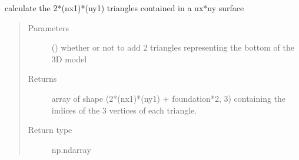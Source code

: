 \documentclass[letterpaper,10pt,english]{sphinxmanual}
\begin{document}

\begin{fulllineitems}
\label{\detokenize{stlutils:stlutils.create_faces}}
\sphinxAtStartPar
calculate the 2*(nx\sphinxhyphen{}1)*(ny\sphinxhyphen{}1) triangles contained in a nx*ny surface
\begin{quote}\begin{description}
\item[{Parameters}] \leavevmode
\sphinxAtStartPar
{} () \textendash{} whether or not to add 2 triangles representing the bottom of the 3D model

\item[{Returns}] \leavevmode
\sphinxAtStartPar
array of shape (2*(nx\sphinxhyphen{}1)*(ny\sphinxhyphen{}1) + foundation*2, 3) containing the indices of the 3 vertices of each triangle.

\item[{Return type}] \leavevmode
\sphinxAtStartPar
np.ndarray

\end{description}\end{quote}

\end{fulllineitems}

\end{document}
